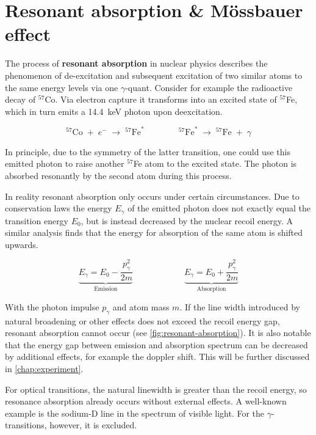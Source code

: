 
\section{Resonant absorption \& Mössbauer effect}
\label{sec:mössbauer-effect}

The process of \textbf{resonant absorption} in nuclear physics describes the 
phenomenon of de-excitation and subsequent excitation of two similar atoms to the same energy 
levels via one $\gamma$-quant. Consider for example the radioactive decay of 
$^{57}$Co. Via electron capture it transforms into an excited state of $^{57}$Fe,
which in turn emits a \SI{14.4}{\kilo\electronvolt} photon upon deexcitation.

\begin{equation*}
^{57}\text{Co}\;+\;e^-\;\longrightarrow\;^{57}\text{Fe}^*\qquad\qquad^{57}\text{Fe}^*\;\longrightarrow\;^{57}\text{Fe}\;+\;\gamma  
\end{equation*}

In principle, due to the symmetry of the latter transition, one could use this 
emitted photon to raise another $^{57}$Fe atom to the excited state. The photon is 
absorbed resonantly by the second atom during this process.

In reality resonant absorption only occurs under certain
circumstances. Due to conservation laws the energy $E_\gamma$ of the emitted photon
does not exactly equal the transition energy $E_0$, but is instead decreased
by the nuclear recoil energy. A similar analysis finds that the energy for absorption
of the same atom is shifted upwards. 

\begin{equation}
\underbrace{E_\gamma = E_0 - \frac{p_\gamma^2}{2m}}_\text{Emission} \qquad\qquad\qquad \underbrace{E_\gamma = E_0 + \frac{p_\gamma^2}{2m}}_\text{Absorption}\label{eq:energy-gap}
\end{equation}

With the photon impulse $p_\gamma$ and atom mass $m$. If the line width introduced by
natural broadening or other effects does not exceed the recoil energy gap, resonant 
absorption cannot occur (see \autoref{fig:resonant-absorption}). It is also notable 
that the energy gap between emission and absorption spectrum can be decreased by 
additional effects, for example the doppler shift. This will be further discussed in \autoref{chap:experiment}.

For optical transitions, the natural linewidth is greater than the recoil energy, so resonance absorption already occurs without external effects. 
A well-known example is the sodium-D line in the spectrum of visible light. For the $\gamma$-transitions, however, it is excluded.

